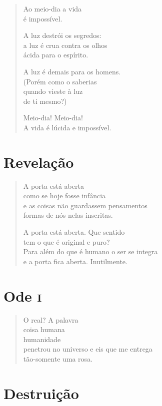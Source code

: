 \begin{verse}
Ao meio-dia a vida\\
é impossível.

A luz destrói os segredos:\\
a luz é crua contra os olhos\\
ácida para o espírito.

A luz é demais para os homens.\\
(Porém como o saberias\\
quando vieste à luz\\
de ti mesmo?)

Meio-dia! Meio-dia!\\
A vida é lúcida e impossível.
\end{verse}

\chapter{Revelação}

\begin{verse}
A porta está aberta\\
como se hoje fosse infância\\
e as coisas não guardassem pensamentos\\ formas de nós nelas inscritas.

A porta está aberta. Que sentido\\
tem o que é original e puro?\\
Para além do que é humano o ser se integra\\
e a porta fica aberta. Inutilmente.
\end{verse}

\chapter{Ode \textsc{i}}

\begin{verse}
O real? A palavra\\
coisa humana\\
humanidade\\
penetrou no universo e eis que me entrega\\ tão-somente uma rosa.
\end{verse}

\chapter{Destruição}

